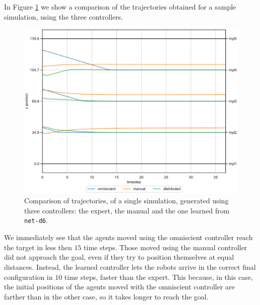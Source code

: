 In Figure \ref{fig:net-d6traj1} we show a comparison of the trajectories obtained 
for a sample simulation, using the three controllers.
\begin{figure}[!htb]
	\centering
	\includegraphics[width=.7\textwidth]{contents/images/net-d6/animation-distributed1}%
	\caption[Evaluation of the trajectories obtained with \texttt{prox\_comm} 
	input.]{Comparison of trajectories, of a single simulation, generated using three 
		controllers: the expert, the manual and the one learned from \texttt{net-d6}.}
	\label{fig:net-d6traj1}
\end{figure}  
We immediately see that the agents moved using the omniscient controller 
reach the target in less then $15$ time steps. Those moved using the manual 
controller did not approach the goal, even if they try to position themselves at 
equal distances. Instead, the learned controller lets the robots arrive in the 
correct final configuration in $10$ time steps, faster than the expert. This 
because, in this case, the initial positions of the agents moved with the omniscient 
controller are farther than in the other case, so it takes longer to reach the goal.

